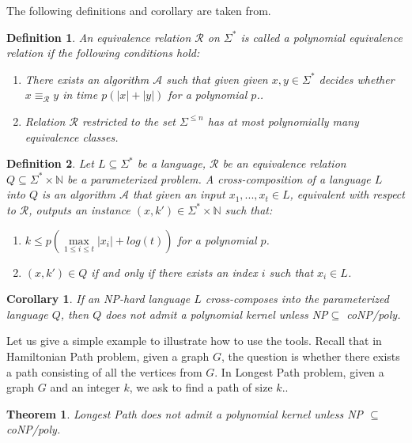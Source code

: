 \documentclass[en]{pracamgr}
\newtheorem{definition}{Definition}
\newtheorem{theorem}{Theorem}
\newtheorem{corollary}{Corollary}
\begin{document}
The following definitions and corollary are taken from. %

\begin{definition}\label{polynomial equivalence relation}
	An equivalence relation $\mathcal{R}$ on $\Sigma^*$ is called a \textup{polynomial equivalence relation} if the following conditions hold:
	\begin{enumerate}
		\item There exists an algorithm $\mathcal{A}$ such that given given $x,y \in \Sigma^*$ decides whether $x \equiv_{\mathcal{R}} y$ in time $p(|x|+|y|)$ for a polynomial $p$..
		\item Relation $\mathcal{R}$ restricted to the set $\Sigma^{\leq n}$ has at most polynomially many equivalence classes.
	\end{enumerate}
\end{definition}

\begin{definition}\label{cross-composition}
	Let $L \subseteq \Sigma^*$ be a language, $\mathcal{R}$ be an equivalence relation $Q \subseteq \Sigma^* \times \mathbb{N}$ be a parameterized problem. A \textup{cross-composition} of a language $L$ into $Q$ is an algorithm $\mathcal{A}$ that given an input $x_1,...,x_t \in L$, equivalent with respect to $\mathcal{R}$, outputs an instance $(x,k') \in \Sigma^* \times \mathbb{N}$ such that:
	\begin{enumerate}
		\item $k \leq p(\max\limits_{1 \leq i \leq t} |x_i| + log(t))$ for a polynomial $p$.
		\item $(x,k') \in Q$ if and only if there exists an index $i$ such that $x_i \in L$.
	\end{enumerate}
\end{definition}

\begin{corollary}\label{nokernel}
	If an NP-hard language $L$ cross-composes into the parameterized language $Q$, then $Q$ does not admit a polynomial kernel unless \textup{NP$\subseteq$ coNP/poly}.
\end{corollary}

Let us give a simple example to illustrate how to use the tools. Recall that in {\sc Hamiltonian Path} problem, given a graph $G$, the question is whether there exists a path consisting of all the vertices from $G$. In {\sc Longest Path} problem, given a graph $G$ and an integer $k$, we ask to find a path of size $k$.. 

\begin{theorem}
	{\sc Longest Path} does not admit a polynomial kernel unless NP $\subseteq$ coNP/poly.
\end{theorem}
\end{document}
